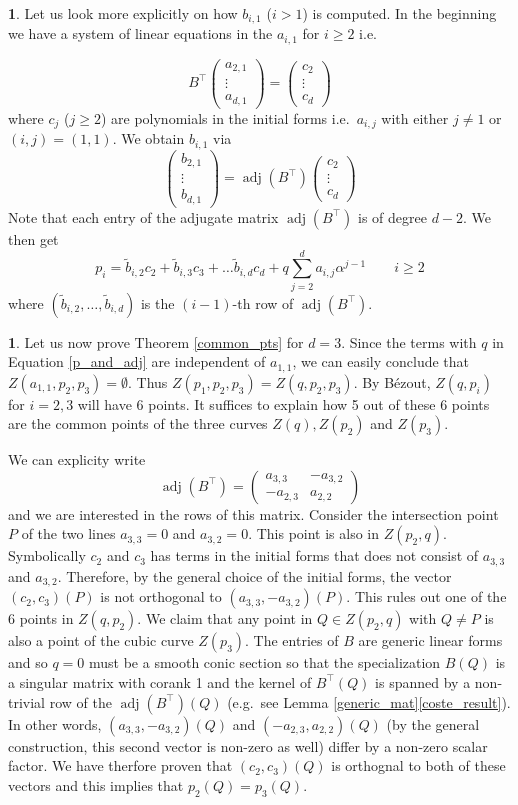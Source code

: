 \documentclass[a4paper,11pt]{amsart}%
\newcommand\adj{\operatorname{adj}}
\newcommand\pmat[1]{\begin{pmatrix} #1 \end{pmatrix}}
\theoremstyle{definition}
\newtheorem{none}[theorem]{}
\begin{document}
\begin{none}
Let us look more explicitly on how $b_{i,1}$ ($i>1$) is computed. In the beginning we have a system of linear equations in the 
$a_{i,1}$ for $i\ge 2$ i.e.

$$B^\top\pmat{a_{2,1}\\ \vdots \\a_{d,1}} = \pmat{c_2 \\ \vdots \\ c_d}$$
where $c_j$ ($j\ge 2$) are polynomials in the initial forms i.e.\ $a_{i,j}$ with either $j\ne 1$ or $(i,j)=(1,1)$. 
We obtain $b_{i,1}$
via
$$\pmat{b_{2,1}\\ \vdots \\b_{d,1}} =\adj(B^\top)\pmat{c_2 \\ \vdots \\ c_d}$$
Note that each entry of the adjugate matrix $\adj(B^\top)$ is of degree $d-2$. We then get 
\begin{equation}\label{p_and_adj}
p_i = \tilde b_{i,2} c_2 + \tilde b_{i,3} c_3 + \dots \tilde b_{i,d} c_d + q\sum_{j=2}^d a_{i,j}\alpha^{j-1} \qquad i\ge 2
\end{equation}
where $(\tilde b_{i,2} , \dots ,\tilde b_{i,d})$ is the $(i-1)$-th row of $\adj(B^\top)$.
\end{none}

\begin{none}\label{common_pts_d=3}
Let us now prove Theorem \ref{common_pts} for $d=3$. 
Since the terms with $q$ in Equation \eqref{p_and_adj} are independent of $a_{1,1}$, we can easily conclude that $Z(a_{1,1},p_2,p_3)=\emptyset$.
Thus $Z(p_1,p_2,p_3)=Z(q,p_2,p_3)$. By Bézout, $Z(q,p_i)$ for $i=2,3$ will have $6$ points. It suffices to explain how 5 out of these 6 points are the common points of the three curves 
$Z(q), Z(p_2)$ and $Z(p_3)$. 

We can explicity write   
$$\adj(B^\top) = \pmat{a_{3,3} & -a_{3,2}\\ -a_{2,3} & a_{2,2}}$$
and we are interested in the rows of this matrix.
Consider the intersection point 
$P$ of the two lines $a_{3,3}=0$ and $a_{3,2}=0$. This point is also in $Z(p_2,q)$. 
Symbolically $c_2$ and $c_3$  has terms in the initial forms that does not consist of $a_{3,3}$ and $a_{3,2}$. Therefore, by the general choice of the initial forms, the vector $(c_2, c_3)(P)$ is not 
orthogonal to $(a_{3,3},-a_{3,2})(P)$. This rules out one of the $6$ points in $Z(q,p_2)$. We claim that any point in $Q\in Z(p_2,q)$ with $Q\ne P$ is also a point
of the cubic curve $Z(p_3)$. The entries of $B$ are generic linear forms and so $q=0$ must be a smooth conic section so that the specialization $B(Q)$ is a singular 
matrix with corank 1 and the kernel of $B^\top(Q)$ is spanned by a non-trivial row of the $\adj(B^\top)(Q)$ (e.g.\ see Lemma \ref{generic_mat}\ref{coste_result}). 
In other words, $(a_{3,3},-a_{3,2})(Q)$ and 
$(-a_{2,3},a_{2,2})(Q)$ (by the general construction, this second vector is non-zero as well) differ by a non-zero scalar factor. We have therfore proven that $(c_2,c_3)(Q)$ is orthognal to both of 
these vectors and this implies that $p_2(Q)=p_3(Q)$.
\end{none}
\end{document}
